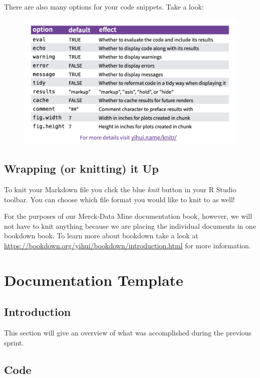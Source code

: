\documentclass[]{book}
\begin{document}
There are also many options for your code snippets. Take a look:

\begin{figure}
\centering
\includegraphics{images/options.png}
\caption{}
\end{figure}

\section{Wrapping (or knitting) it Up}\label{wrapping-or-knitting-it-up}

To knit your Markdown file you click the blue \emph{knit} button in your
R Studio toolbar. You can choose which file format you would like to
knit to as well!

For the purposes of our Merck-Data Mine documentation book, however, we
will not have to knit anything because we are placing the individual
documents in one bookdown book. To learn more about bookdown take a look
at \url{https://bookdown.org/yihui/bookdown/introduction.html} for more
information.

\chapter{Documentation Template}\label{documentation-template}

\section{Introduction}\label{introduction}

This section will give an overview of what was accomplished during the
previous sprint.

\section{Code}\label{code}
\end{document}
